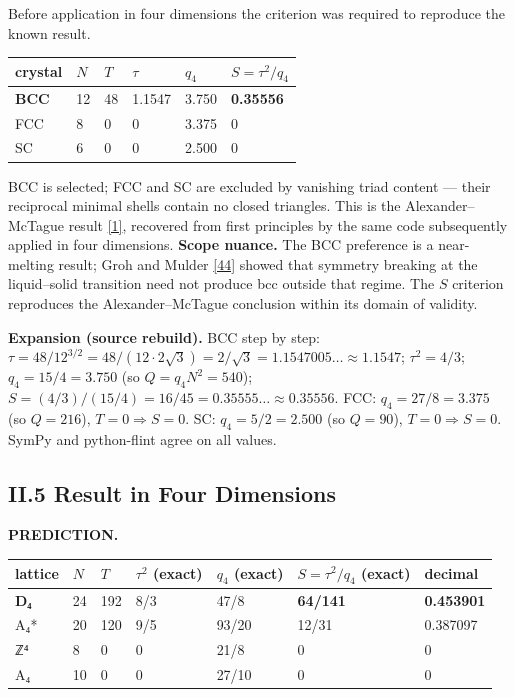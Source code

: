 \documentclass[a4paper,11pt]{article}
\newcommand{\expansion}[1]{\par\smallskip\noindent\textbf{Expansion (source rebuild).} #1\par\smallskip}
\begin{document}
Before application in four dimensions the criterion was required to reproduce the known result.

\begin{center}
\begin{tabular}{llllll}
\hline
crystal & $N$ & $T$ & $\tau$ & $q_4$ & $S=\tau^2/q_4$ \\
\hline
\textbf{BCC} & 12 & 48 & 1.1547 & 3.750 & \textbf{0.35556} \\
FCC & 8 & 0 & 0 & 3.375 & 0 \\
SC & 6 & 0 & 0 & 2.500 & 0 \\
\hline
\end{tabular}
\end{center}

BCC is selected; FCC and SC are excluded by vanishing triad content — their reciprocal minimal shells contain no closed triangles. This is the Alexander–McTague result \hyperref[ref1]{[1]}, recovered from first principles by the same code subsequently applied in four dimensions. \textbf{Scope nuance.} The BCC preference is a near-melting result; Groh and Mulder \hyperref[ref44]{[44]} showed that symmetry breaking at the liquid–solid transition need not produce bcc outside that regime. The $S$ criterion reproduces the Alexander–McTague conclusion within its domain of validity.


\expansion{BCC step by step: $\tau = 48/12^{3/2} = 48/(12 \cdot 2\sqrt{3}) = 2/\sqrt{3} = 1.1547005\ldots \approx 1.1547$; $\tau^2 = 4/3$; $q_4 = 15/4 = 3.750$ (so $Q = q_4N^2 = 540$); $S = (4/3)/(15/4) = 16/45 = 0.35555\ldots \approx 0.35556$. FCC: $q_4 = 27/8 = 3.375$ (so $Q = 216$), $T = 0 \Rightarrow S = 0$. SC: $q_4 = 5/2 = 2.500$ (so $Q = 90$), $T = 0 \Rightarrow S = 0$. SymPy and python-flint agree on all values.}
\subsection*{II.5 Result in Four Dimensions}

\textbf{PREDICTION.}

\begin{center}
\begin{tabular}{lllllll}
\hline
lattice & $N$ & $T$ & $\tau^2$ (exact) & $q_4$ (exact) & $S=\tau^2/q_4$ (exact) & decimal \\
\hline
\textbf{D₄} & 24 & 192 & 8/3 & 47/8 & \textbf{64/141} & \textbf{0.453901} \\
A₄* & 20 & 120 & 9/5 & 93/20 & 12/31 & 0.387097 \\
ℤ⁴ & 8 & 0 & 0 & 21/8 & 0 & 0 \\
A₄ & 10 & 0 & 0 & 27/10 & 0 & 0 \\
\hline
\end{tabular}
\end{center}
\end{document}
